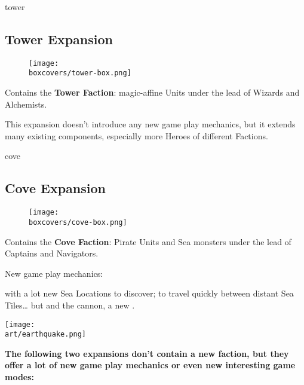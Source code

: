 \begin{multicols}{2}
\begin{expansion}[title=]{tower}
    \subsection*{\color{tower}Tower Expansion}
    \setlength\intextsep{0pt}
    \setlength\columnsep{0.8em}
    \begin{wrapfigure}{l}{0.35\textwidth}
        \texttt{[image: \\boxcovers/tower-box.png]}
    \end{wrapfigure}
    Contains the \textbf{Tower Faction}: magic-affine Units under the lead of Wizards and Alchemists.\par
    \medskip
    This expansion doesn't introduce any new game play mechanics, but it extends many existing components, especially more Heroes of different Factions.
\end{expansion}
\vspace*{\fill}
\columnbreak

\begin{expansion}[title=]{cove}
    \subsection*{\color{cove}Cove Expansion}
    \setlength\intextsep{0pt}
    \setlength\columnsep{0.8em}
    \begin{wrapfigure}{l}{0.35\textwidth}
        \texttt{[image: \\boxcovers/cove-box.png]}
    \end{wrapfigure}
    Contains the \textbf{Cove Faction}: Pirate Units and Sea monsters under the lead of Captains and Navigators.\par
    \medskip
    New game play mechanics:\par
    \smallskip
     with a lot new Sea Locations to discover;  to travel quickly between distant Sea Tiles… but  and the cannon, a new .
\end{expansion}

\hfill{}\texttt{[image: \\art/earthquake.png]}

\end{multicols}
\textbf{The following two expansions don't contain a new faction, but they offer a lot of new game play mechanics or even new interesting game modes:}


